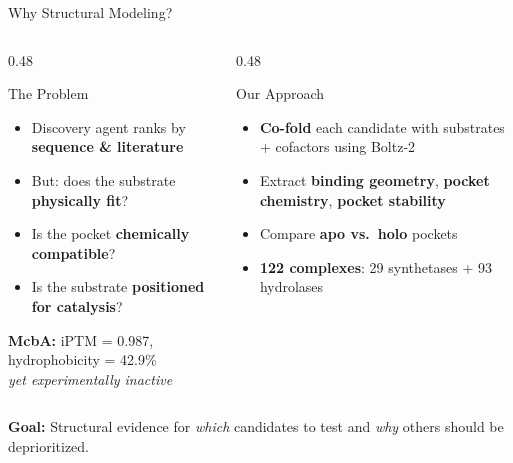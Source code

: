 \documentclass[aspectratio=169, 11pt]{beamer}
\begin{document}
\begin{frame}{Why Structural Modeling?}
\begin{columns}[T]
\begin{column}{0.48\textwidth}
\begin{alertblock}{The Problem}
\begin{itemize}
\item Discovery agent ranks by \textbf{sequence \& literature}
\item But: does the substrate \textbf{physically fit}?
\item Is the pocket \textbf{chemically compatible}?
\item Is the substrate \textbf{positioned for catalysis}?
\end{itemize}
\end{alertblock}
\vspace{4pt}
\colorbox{accentred!15}{\parbox{0.92\textwidth}{\centering\small
\textbf{McbA:} iPTM = 0.987, hydrophobicity = 42.9\%\\
\textit{yet experimentally inactive}
}}
\end{column}
\begin{column}{0.48\textwidth}
\begin{exampleblock}{Our Approach}
\begin{itemize}
\item \textbf{Co-fold} each candidate with substrates + cofactors using Boltz-2
\item Extract \textbf{binding geometry}, \textbf{pocket chemistry}, \textbf{pocket stability}
\item Compare \textbf{apo vs.\ holo} pockets
\item \textbf{122 complexes}: 29 synthetases + 93 hydrolases
\end{itemize}
\end{exampleblock}
\end{column}
\end{columns}

\vspace{4pt}
\begin{center}
\colorbox{lightblue!50}{\parbox{0.88\textwidth}{\centering
\small\textbf{Goal:} Structural evidence for \textit{which} candidates to test and \textit{why} others should be deprioritized.
}}
\end{center}
\end{frame}
\end{document}
